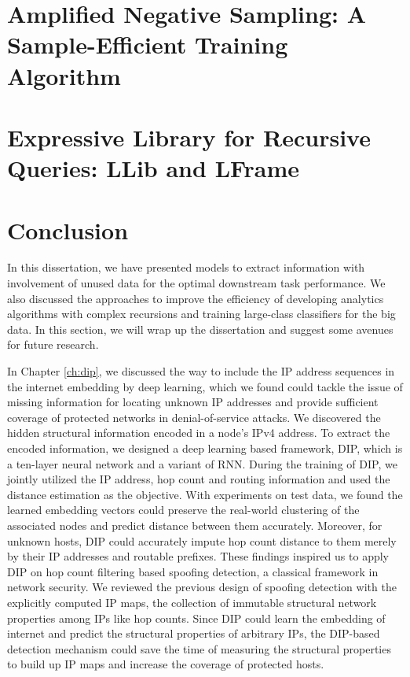 \documentclass [PhD] {uclathes}
\begin{document}


\chapter{Amplified Negative Sampling: A Sample-Efficient Training Algorithm }
\label{ch:nec}


\chapter{Expressive Library for Recursive Queries: LLib and LFrame}
\label{ch:lib}




\chapter{Conclusion}
\label{ch:con}

In this dissertation, we have presented models to extract information with involvement of unused data for the optimal downstream task performance. We also discussed the approaches to improve the efficiency of  developing analytics algorithms with complex recursions and training large-class classifiers for the big data. In this section, we will wrap up the dissertation and suggest some avenues for future research.

In Chapter \ref{ch:dip}, we discussed the way to include the IP address sequences in the internet embedding by deep learning, which we found could tackle the issue of missing information for locating unknown IP addresses and provide sufficient coverage of  protected networks in denial-of-service attacks. We discovered the hidden structural information encoded in a node's IPv4 address. To extract the encoded information, we designed a deep learning based framework, DIP, which is a ten-layer neural network and a variant of RNN. During the training of DIP, we jointly utilized the IP address, hop count and routing information and used the distance estimation as the objective. With experiments on  test data, we found the learned embedding vectors  could preserve the real-world clustering of the associated nodes and predict distance between them accurately. Moreover, for unknown hosts, DIP could accurately impute hop count distance to them merely by their IP addresses and routable prefixes. These findings inspired us to apply DIP on hop count filtering based spoofing detection, a classical framework in network security. We reviewed the previous design of spoofing detection with the explicitly computed IP maps, the collection of  immutable structural network properties  among IPs like hop counts.  Since DIP could learn the embedding of internet and predict the structural properties of arbitrary IPs, the DIP-based detection mechanism could save the time of measuring the structural properties to build up  IP maps and increase the coverage of protected hosts. 
\end{document}
